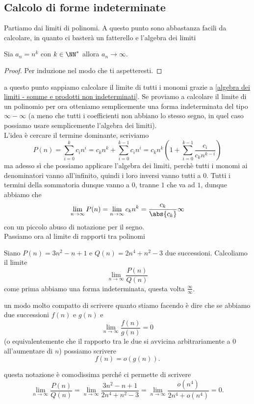 \documentclass[11pt]{scrartcl}
\begin{document}
	\subsection{Calcolo di forme indeterminate}
	Partiamo dai limiti di polinomi. A questo punto sono abbastanza facili da calcolare, in quanto ci basterà un fatterello e l'algebra dei limiti
	\begin{proposition}
		Sia $a_n=n^k$ con $k\in\NN^*$ allora $a_n\to\infty$. 
	\end{proposition}
	\begin{proof}
		Per induzione nel modo che ti aspetteresti.
	\end{proof}
	a questo punto sappiamo calcolare il limite di tutti i monomi grazie a \ref{algebra dei limiti - somme e prodotti non indeterminati}. Se proviamo a calcolare il limite di un polinomio per ora otteniamo semplicemente una forma indeterminata del tipo $\infty-\infty$ (a meno che tutti i coefficienti non abbiano lo stesso segno, in quel caso possiamo usare semplicemente l'algebra dei limiti). \\
	L'idea è cercare il termine dominante, scriviamo
	$$P(n)=\sum_{i=0}^k c_i n^i=c_k n^k + \sum_{i=0}^{k-1}c_i n^i=c_k n^k \left(1+\sum_{i=0}^{k-1}\frac{c_i}{c_k n^{k-i}}\right)$$
	ma adesso sì che possiamo applicare l'algebra dei limiti, perchè tutti i monomi ai denominatori vanno all'infinito, quindi i loro inversi vanno tutti a $0$. Tutti i termini della sommatoria dunque vanno a $0$, tranne $1$ che va ad $1$, dunque abbiamo che
	$$\lim_{n\to \infty}P(n)=\lim_{n\to\infty}c_k n^k=\frac{c_k}{\abs{c_k}}\infty$$
	con un piccolo abuso di notazione per il segno. \\
	Passiamo ora al limite di rapporti tra polinomi
	\begin{example}
		Siano $P(n)=3n^2-n+1$ e $Q(n)=2n^4+n^2-3$ due successioni. Calcoliamo il limite
		$$\lim_{n\to\infty}\frac{P(n)}{Q(n)}$$
		come prima abbiamo una forma indeterminata, questa volta $\frac{\infty}{\infty}$.
	\end{example}
	\begin{definition}
		un modo molto compatto di scrivere quanto stiamo facendo è dire che se abbiamo due successioni $f(n)$ e $g(n)$ e 
		$$\lim_{n\to\infty}\frac{f(n)}{g(n)}=0$$
		(o equivalentemente che il rapporto tra le due si avvicina arbitrariamente a $0$ all'aumentare di $n$) possiamo scrivere 
		$$f(n)=o(g(n)).$$
	\end{definition}
	questa notazione è comodissima perché ci permette di scrivere
	$$\lim_{n\to\infty}\frac{P(n)}{Q(n)}=\lim_{n\to\infty}\frac{3n^2-n+1}{2n^4+n^2-3}=\lim_{n\to\infty}\frac{o(n^4)}{2n^4+o(n^4)}=0.$$
	
\end{document}
